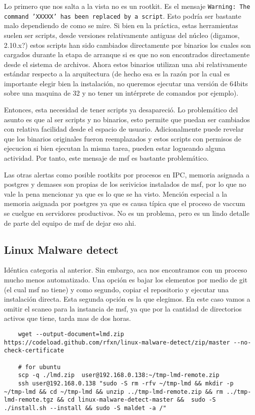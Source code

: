 \documentclass[11pt]{utalcaDoc}
\begin{document}
Lo primero que nos salta a la vista no es un rootkit. Es el mensaje \texttt{Warning: The command 'XXXXX' has been replaced by a script}. Esto podría ser bastante malo dependiendo de como se mire. Si bien en la práctica, estas herramientas suelen ser scripts, desde versiones relativamente antiguas del núcleo (digamos, 2.10.x?) estos scripts han sido cambiados directamente por binarios los cuales son cargados durante la etapa de arranque si es que no son encontrados directamente desde el sistema de archivos. Ahora estos binarios utilizan una abi relativamente estándar respecto a la arquitectura (de hecho esa es la razón por la cual es importante elegir bien la instalación, no queremos ejecutar una versión de 64bits sobre una maquina de 32 y no tener un intérprete de comandos por ejemplo).

Entonces, esta necesidad de tener scripts ya desapareció. Lo problemático del asunto es que al ser scripts y no binarios, esto permite que puedan ser cambiados con relativa facilidad desde el espacio de usuario. Adicionalmente puede revelar que los binarios originales fueron reemplazados y estos scripts con permisos de ejecucion si bien ejecutan la misma tarea, pueden estar logueando alguna actividad. Por tanto, este mensaje de msf es bastante problemático.

Las otras alertas como posible rootkits por procesos en IPC, memoria asignada a postgres y demases son propias de los serivicios instalados de msf, por lo que no vale la pena mencionar ya que es lo que se ha visto. Mención especial a la memoria asignada por postgres ya que es causa típica que el proceso de vaccum se cuelgue en servidores productivos. No es un problema, pero es un lindo detalle de parte del equipo de msf de dejar eso ahi.


\subsection{Linux Malware detect}

Idéntica categoria al anterior. Sin embargo, aca nos encontramos con un proceso mucho menos automatizado. Una opción es bajar los elementos por medio de git (el cual msf no tiene) y como segundo, copiar el repositorio y ejecutar una instalación directa. Esta segunda opción es la que elegimos. En este caso vamos a omitir el scaneo para la instancia de msf, ya que por la cantidad de directorios activos que tiene, tarda mas de dos horas.

\begin{verbatim}
	wget --output-document=lmd.zip https://codeload.github.com/rfxn/linux-malware-detect/zip/master --no-check-certificate

	# for ubuntu
	scp -q ./lmd.zip  user@192.168.0.138:~/tmp-lmd-remote.zip 
	ssh user@192.168.0.138 "sudo -S rm -rfv ~/tmp-lmd && mkdir -p ~/tmp-lmd && cd ~/tmp-lmd && unzip ../tmp-lmd-remote.zip && rm ../tmp-lmd-remote.tgz && cd linux-malware-detect-master &&  sudo -S ./install.sh --install && sudo -S maldet -a /" 
\end{verbatim}
\end{document}
